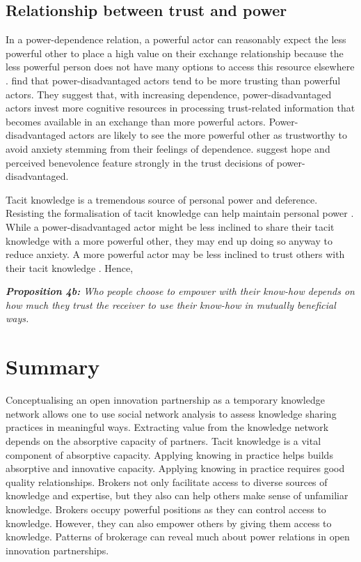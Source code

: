 \subsection{Relationship between trust and power}

In a power-dependence relation, a powerful actor can reasonably expect the less powerful other to place a high value on their exchange relationship because the less powerful person does not have many options to access this resource elsewhere \citep{emerson1962power}. \citet{schilke2015power} find that power-disadvantaged actors tend to be more trusting than powerful actors. They suggest that, with increasing dependence, power-disadvantaged actors invest more cognitive resources in processing trust-related information that becomes available in an exchange than more powerful actors. Power-disadvantaged actors are likely to see the more powerful other as trustworthy to avoid anxiety stemming from their feelings of dependence. \citet{schilke2015power} suggest hope and perceived benevolence feature strongly in the trust decisions of power-disadvantaged. \medskip

Tacit knowledge is a tremendous source of personal power and deference. Resisting the formalisation of tacit knowledge can help maintain personal power \citep{schultze2004knowing}. While a power-disadvantaged actor might be less inclined to share their tacit knowledge with a more powerful other, they may end up doing so anyway to reduce anxiety. A more powerful actor may be less inclined to trust others with their tacit knowledge \citep{schilke2015power}. Hence, \bigskip

\begin{tcolorbox}
\textit{\textbf{Proposition 4b:} Who people choose to empower with their know-how depends on how much they trust the receiver to use their know-how in mutually beneficial ways.} 
\end{tcolorbox}

\section{Summary}

Conceptualising an open innovation partnership as a temporary knowledge network allows one to use social network analysis to assess knowledge sharing practices in meaningful ways. Extracting value from the knowledge network depends on the absorptive capacity of partners. Tacit knowledge is a vital component of absorptive capacity. Applying knowing in practice helps builds absorptive and innovative capacity. Applying knowing in practice requires good quality relationships. Brokers not only facilitate access to diverse sources of knowledge and expertise, but they also can help others make sense of unfamiliar knowledge. Brokers occupy powerful positions as they can control access to knowledge. However, they can also empower others by giving them access to knowledge. Patterns of brokerage can reveal much about power relations in open innovation partnerships. \medskip

